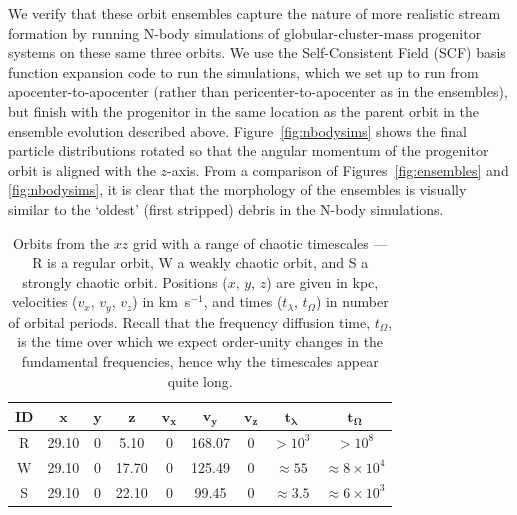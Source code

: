 \documentclass[letterpaper,12pt,preprint]{aastex}
\newcommand{\bs}[1]{\boldsymbol{#1}}
\begin{document}
We verify that these orbit ensembles capture the nature of more realistic stream formation by running N-body simulations of globular-cluster-mass progenitor systems on these same three orbits. We use the Self-Consistent Field (SCF) basis function expansion code \citep{hernquist92} to run the simulations, which we set up to run from apocenter-to-apocenter (rather than pericenter-to-apocenter as in the ensembles), but finish with the progenitor in the same location as the parent orbit in the ensemble evolution described above. Figure~\ref{fig:nbodysims} shows the final particle distributions rotated so that the angular momentum of the progenitor orbit is aligned with the $z$-axis. From a comparison of Figures~\ref{fig:ensembles} and \ref{fig:nbodysims}, it is clear that the morphology of the ensembles is visually similar to the `oldest' (first stripped) debris in the N-body simulations.

\begin{table}[ht]
\begin{center}
	\begin{tabular}{c | c c c c c c | c c }
		{\bf ID} & $\bs{x}$ & $\bs{y}$ & $\bs{z}$ & $\bs{v_x}$ & $\bs{v_y}$ & $\bs{v_z}$ & $\bs{t_\lambda}$ & $\bs{t_\Omega}$ \\\toprule
		R & 29.10 & 0 & 5.10 & 0 & 168.07 & 0 & $>10^3$ & $>10^8$\\
		\midrule
		W & 29.10 & 0 & 17.70 & 0 & 125.49 & 0 & $\approx55$ & $\approx8 \times 10^4$\\
		\midrule
		S & 29.10 & 0 & 22.10 & 0 & 99.45 & 0 & $\approx3.5$ & $\approx6 \times 10^3$\\
		\bottomrule
		\end{tabular}
	\caption{Orbits from the $xz$ grid with a range of chaotic timescales --- R is a regular orbit, W a weakly chaotic orbit, and S a strongly chaotic orbit. Positions ($x$, $y$, $z$) are given in kpc, velocities ($v_x$, $v_y$, $v_z$) in km~s$^{-1}$, and times ($t_\lambda$, $t_\Omega$) in number of orbital periods. Recall that the frequency diffusion time, $t_\Omega$, is the time over which we expect order-unity changes in the fundamental frequencies, hence why the timescales appear quite long. \label{tbl:three-orbits}}
\end{center}
\end{table}
\end{document}

